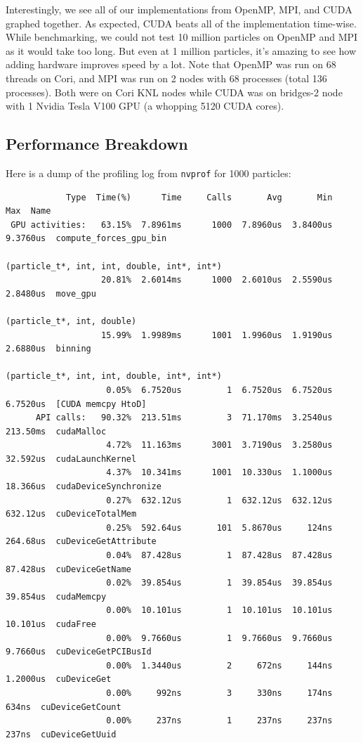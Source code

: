 \documentclass{article}
\begin{document}
Interestingly, we see all of our implementations from OpenMP, MPI, and CUDA graphed together. As expected, CUDA beats all of the implementation time-wise. While benchmarking, we could not test 10 million particles on OpenMP and MPI as it would take too long. But even at 1 million particles, it's amazing to see how adding hardware improves speed by a lot. Note that OpenMP was run on 68 threads on Cori, and MPI was run on 2 nodes with 68 processes (total 136 processes). Both were on Cori KNL nodes while CUDA was on bridges-2 node with 1 Nvidia Tesla V100 GPU (a whopping 5120 CUDA cores).

\subsection{Performance Breakdown}
Here is a dump of the profiling log from \verb|nvprof| for 1000 particles:

\begin{verbatim}
            Type  Time(%)      Time     Calls       Avg       Min       Max  Name
 GPU activities:   63.15%  7.8961ms      1000  7.8960us  3.8400us  9.3760us  compute_forces_gpu_bin
                                                                (particle_t*, int, int, double, int*, int*)
                   20.81%  2.6014ms      1000  2.6010us  2.5590us  2.8480us  move_gpu
                                                                (particle_t*, int, double)
                   15.99%  1.9989ms      1001  1.9960us  1.9190us  2.6880us  binning
                                                                (particle_t*, int, int, double, int*, int*)
                    0.05%  6.7520us         1  6.7520us  6.7520us  6.7520us  [CUDA memcpy HtoD]
      API calls:   90.32%  213.51ms         3  71.170ms  3.2540us  213.50ms  cudaMalloc
                    4.72%  11.163ms      3001  3.7190us  3.2580us  32.592us  cudaLaunchKernel
                    4.37%  10.341ms      1001  10.330us  1.1000us  18.366us  cudaDeviceSynchronize
                    0.27%  632.12us         1  632.12us  632.12us  632.12us  cuDeviceTotalMem
                    0.25%  592.64us       101  5.8670us     124ns  264.68us  cuDeviceGetAttribute
                    0.04%  87.428us         1  87.428us  87.428us  87.428us  cuDeviceGetName
                    0.02%  39.854us         1  39.854us  39.854us  39.854us  cudaMemcpy
                    0.00%  10.101us         1  10.101us  10.101us  10.101us  cudaFree
                    0.00%  9.7660us         1  9.7660us  9.7660us  9.7660us  cuDeviceGetPCIBusId
                    0.00%  1.3440us         2     672ns     144ns  1.2000us  cuDeviceGet
                    0.00%     992ns         3     330ns     174ns     634ns  cuDeviceGetCount
                    0.00%     237ns         1     237ns     237ns     237ns  cuDeviceGetUuid
\end{verbatim}
\end{document}
